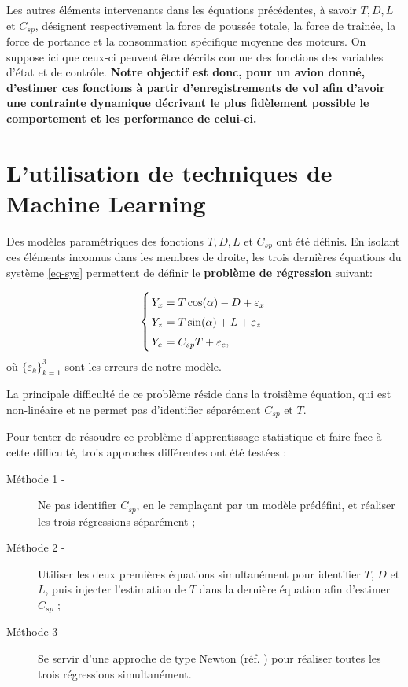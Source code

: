 \documentclass[a0,portrait]{a0poster}
\begin{document}
\begin{multicols}{2}
Les autres éléments intervenants dans les équations précédentes, à savoir $T,D,L$ et $C_{sp}$, désignent respectivement la force de poussée totale, la force de traînée, la force de portance et la consommation spécifique moyenne des moteurs. On suppose ici que ceux-ci peuvent être décrits comme des fonctions des variables d'état et de contrôle. \textbf{Notre objectif est donc, pour un avion donné, d'estimer ces fonctions à partir d'enregistrements de vol afin d'avoir une contrainte dynamique décrivant le plus fidèlement possible le comportement et les performance de celui-ci.}

\section{L'utilisation de techniques de Machine Learning}

Des modèles paramétriques des fonctions $T,D,L$ et $C_{sp}$ ont été définis. En isolant ces éléments inconnus dans les membres de droite, les trois dernières équations du système \eqref{eq-sys} permettent de définir le \textbf{problème de régression} suivant:

\begin{equation} \label{eq-regpb}
\left\{
\arraycolsep=1.4pt\def\arraystretch{1.5}
\begin{array}{ll}
Y_x &= T \cos(\alpha) - D + \varepsilon_x \\
Y_z &= T \sin(\alpha) + L + \varepsilon_z \\
Y_c &= C_{sp} T+ \varepsilon_c,
\end{array}
\right.
\end{equation}
où $\{\varepsilon_k\}_{k=1}^3$ sont les erreurs de notre modèle.

La principale difficulté de ce problème réside dans la troisième équation, qui est non-linéaire et ne permet pas d'identifier séparément $C_{sp}$ et $T$.
\newline

Pour tenter de résoudre ce problème d'apprentissage statistique et faire face à cette difficulté, trois approches différentes ont été testées :
\begin{description}
\item[Méthode 1 -] Ne pas identifier $C_{sp}$, en le remplaçant par un modèle prédéfini, et réaliser les trois régressions séparément ;
\item[Méthode 2 -] Utiliser les deux premières équations simultanément pour identifier $T$, $D$ et $L$, puis injecter l'estimation de $T$ dans la dernière équation afin d'estimer $C_{sp}$ ;
\item[Méthode 3 -] Se servir d'une approche de type Newton (réf. \cite{bonnans06}) pour réaliser toutes les trois régressions simultanément.
\end{description}
\vspace{1cm}


\end{multicols}
\end{document}
